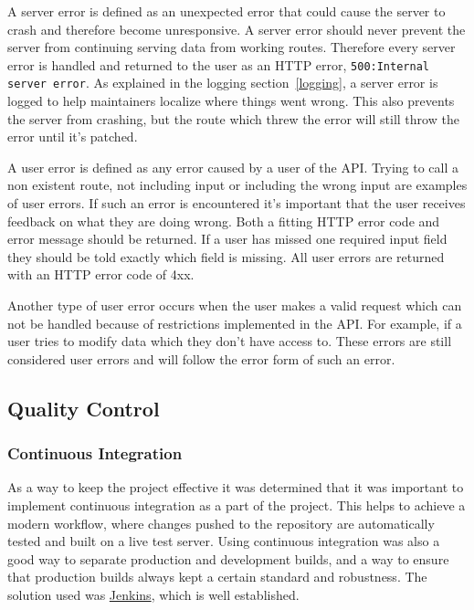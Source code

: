 A server error is defined as an unexpected error that could cause the server to crash and therefore become unresponsive. A server error should never prevent the server from continuing serving data from working routes. Therefore every server error is handled and returned to the user as an HTTP error, \texttt{500:\@ Internal server error}. As explained in the logging section~\ref{logging}, a server error is logged to help maintainers localize where things went wrong. This also prevents the server from crashing, but the route which threw the error will still throw the error until it's patched.

A user error is defined as any error caused by a user of the API. Trying to call a non existent route, not including input or including the wrong input are examples of user errors. If such an error is encountered it's important that the user receives feedback on what they are doing wrong. Both a fitting HTTP error code and error message should be returned. If a user has missed one required input field they should be told exactly which field is missing. All user errors are returned with an HTTP error code of 4xx.

Another type of user error occurs when the user makes a valid request which can not be handled because of restrictions implemented in the API. For example, if a user tries to modify data which they don't have access to. These errors are still considered user errors and will follow the error form of such an error.

\subsection{Quality Control}
\subsubsection{Continuous Integration}
As a way to keep the project effective it was determined that it was important to implement continuous integration as a part of the project. This helps to achieve a modern workflow, where changes pushed to the repository are automatically tested and built on a live test server. Using continuous integration was also a good way to separate production and development builds, and a way to ensure that production builds always kept a certain standard and robustness. The solution used was \href{https://jenkins-ci.org/}{Jenkins}, which is well established.


